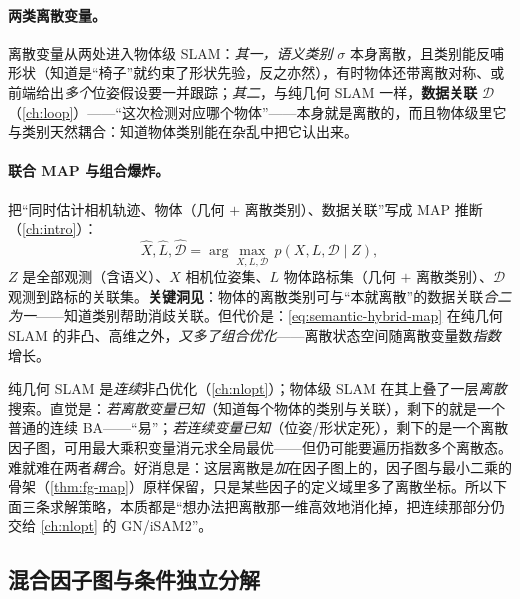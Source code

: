 \paragraph{两类离散变量。}
离散变量从两处进入物体级 SLAM\cite{carlone2026handbook}：\emph{其一，语义类别} $\sigma$ 本身离散，且类别能反哺形状（知道是“椅子”就约束了形状先验，反之亦然\cite{wang2021ellipsdf}），有时物体还带离散对称\cite{teng2021symmetry}、或前端给出\emph{多个}位姿假设要一并跟踪\cite{hsiao2019dynamicmh}；\emph{其二}，与纯几何 SLAM 一样，\textbf{数据关联} $\mathcal{D}$（\cref{ch:loop}）——“这次检测对应哪个物体”——本身就是离散的，而且物体级里它与类别天然耦合：知道物体类别能在杂乱中把它认出来。

\paragraph{联合 MAP 与组合爆炸。}
把“同时估计相机轨迹、物体（几何 $+$ 离散类别）、数据关联”写成 MAP 推断（\cref{ch:intro}）：
\begin{equation}
  \hat{X},\hat{L},\hat{\mathcal{D}}=\arg\max_{X,L,\mathcal{D}}\,p(X,L,\mathcal{D}\mid Z),
  \label{eq:semantic-hybrid-map}
\end{equation}
$Z$ 是全部观测（含语义）、$X$ 相机位姿集、$L$ 物体路标集（几何 $+$ 离散类别）、$\mathcal{D}$ 观测到路标的关联集\cite{carlone2026handbook}。\textbf{关键洞见}：物体的离散类别可与“本就离散”的数据关联\emph{合二为一}——知道类别帮助消歧关联。但代价是：\cref{eq:semantic-hybrid-map} 在纯几何 SLAM 的非凸、高维之外，\emph{又多了组合优化}——离散状态空间随离散变量数\emph{指数}增长。

\begin{insight}
纯几何 SLAM 是\emph{连续}非凸优化（\cref{ch:nlopt}）；物体级 SLAM 在其上叠了一层\emph{离散}搜索。直觉是：\emph{若离散变量已知}（知道每个物体的类别与关联），剩下的就是一个普通的连续 BA——“易”；\emph{若连续变量已知}（位姿/形状定死），剩下的是一个离散因子图，可用最大乘积变量消元求全局最优——但仍可能要遍历指数多个离散态。难就难在两者\emph{耦合}。好消息是：这层离散是\emph{加}在因子图上的，因子图与最小二乘的骨架（\cref{thm:fg-map}）原样保留，只是某些因子的定义域里多了离散坐标。所以下面三条求解策略，本质都是“想办法把离散那一维高效地消化掉，把连续那部分仍交给 \cref{ch:nlopt} 的 GN/iSAM2”。
\end{insight}

\subsection{混合因子图与条件独立分解}
\label{sec:semantic-hybrid-decomp}


